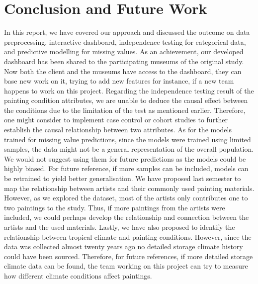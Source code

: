 \documentclass[11pt, oneside]{article}
\begin{document}


\section{Conclusion and Future Work}
In this report, we have covered our approach and discussed the outcome on data preprocessing, interactive dashboard, independence testing for categorical data, and predictive modelling for missing values. As an achievement, our developed dashboard has been shared to the participating museums of the original study. Now both the client and the museums have access to the dashboard, they can base new work on it, trying to add new features for instance, if a new team happens to work on this project.
\bigbreak 
\noindent Regarding the independence testing result of the painting condition attributes, we are unable to deduce the causal effect between the conditions due to the limitation of the test as mentioned earlier. Therefore, one might consider to implement case control or cohort studies to further establish the causal relationship between two attributes. As for the models trained for missing value predictions, since the models were trained using limited samples, the data might not be a general representation of the overall population. We would not suggest using them for future predictions as the models could be highly biased. For future reference, if more samples can be included, models can be retrained to yield better generalisation.
\bigbreak
\noindent We have proposed last semester to map the relationship between artists and their commonly used painting materials. However, as we explored the dataset, most of the artists only contributes one to two paintings to the study. Thus, if more paintings from the artists were included, we could perhaps develop the relationship and connection between the artists and the used materials.
\bigbreak
\noindent Lastly, we have also proposed to identify the relationship between tropical climate and painting conditions. However, since the data was collected almost twenty years ago no detailed storage climate history could have been sourced. Therefore, for future references, if more detailed storage climate data can be found, the team working on this project can try to measure how different climate conditions affect paintings.
\end{document}
